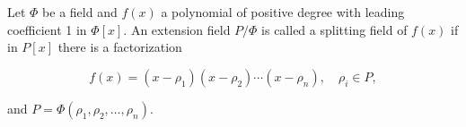Let $\Phi$ be a field and $f(x)$ a polynomial of positive degree with leading coefficient 1 in $\Phi[x]$. An extension field $P/\Phi$ is called a splitting field of $f(x)$ if in $P[x]$ there is a factorization

$$f(x) = (x - \rho_1)(x - \rho_2) \cdots (x - \rho_n), \quad \rho_i \in P,$$

and $P = \Phi(\rho_1, \rho_2, \dots, \rho_n)$.
